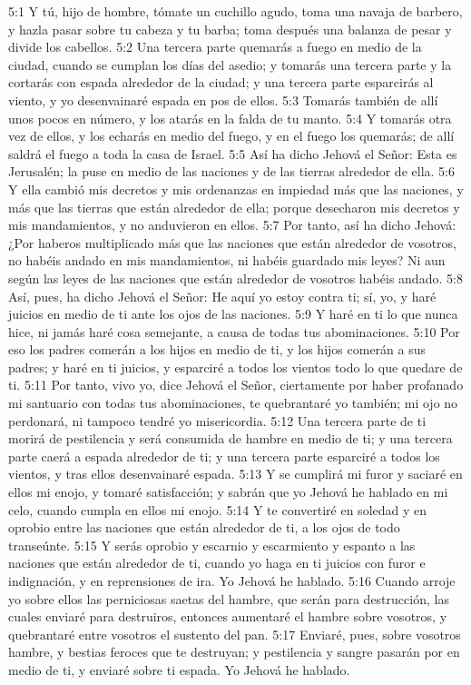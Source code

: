5:1 Y tú, hijo de hombre, tómate un cuchillo agudo, toma una navaja de barbero, y hazla pasar sobre tu cabeza y tu barba; toma después una balanza de pesar y divide los cabellos.   
5:2 Una tercera parte quemarás a fuego en medio de la ciudad, cuando se cumplan los días del asedio; y tomarás una tercera parte y la cortarás con espada alrededor de la ciudad; y una tercera parte esparcirás al viento, y yo desenvainaré espada en pos de ellos.   
5:3 Tomarás también de allí unos pocos en número, y los atarás en la falda de tu manto.   
5:4 Y tomarás otra vez de ellos, y los echarás en medio del fuego, y en el fuego los quemarás; de allí saldrá el fuego a toda la casa de Israel.   
5:5 Así ha dicho Jehová el Señor: Esta es Jerusalén; la puse en medio de las naciones y de las tierras alrededor de ella.   
5:6 Y ella cambió mis decretos y mis ordenanzas en impiedad más que las naciones, y más que las tierras que están alrededor de ella; porque desecharon mis decretos y mis mandamientos, y no anduvieron en ellos.   
5:7 Por tanto, así ha dicho Jehová: ¿Por haberos multiplicado más que las naciones que están alrededor de vosotros, no habéis andado en mis mandamientos, ni habéis guardado mis leyes? Ni aun según las leyes de las naciones que están alrededor de vosotros habéis andado.   
5:8 Así, pues, ha dicho Jehová el Señor: He aquí yo estoy contra ti; sí, yo, y haré juicios en medio de ti ante los ojos de las naciones.   
5:9 Y haré en ti lo que nunca hice, ni jamás haré cosa semejante, a causa de todas tus abominaciones. 
5:10 Por eso los padres comerán a los hijos en medio de ti, y los hijos comerán a sus padres; y haré en ti juicios, y esparciré a todos los vientos todo lo que quedare de ti.   
5:11 Por tanto, vivo yo, dice Jehová el Señor, ciertamente por haber profanado mi santuario con todas tus abominaciones, te quebrantaré yo también; mi ojo no perdonará, ni tampoco tendré yo misericordia.   
5:12 Una tercera parte de ti morirá de pestilencia y será consumida de hambre en medio de ti; y una tercera parte caerá a espada alrededor de ti; y una tercera parte esparciré a todos los vientos, y tras ellos desenvainaré espada.   
5:13 Y se cumplirá mi furor y saciaré en ellos mi enojo, y tomaré satisfacción; y sabrán que yo Jehová he hablado en mi celo, cuando cumpla en ellos mi enojo.   
5:14 Y te convertiré en soledad y en oprobio entre las naciones que están alrededor de ti, a los ojos de todo transeúnte.   
5:15 Y serás oprobio y escarnio y escarmiento y espanto a las naciones que están alrededor de ti, cuando yo haga en ti juicios con furor e indignación, y en reprensiones de ira. Yo Jehová he hablado.   
5:16 Cuando arroje yo sobre ellos las perniciosas saetas del hambre, que serán para destrucción, las cuales enviaré para destruiros, entonces aumentaré el hambre sobre vosotros, y quebrantaré entre vosotros el sustento del pan.   
5:17 Enviaré, pues, sobre vosotros hambre, y bestias feroces que te destruyan; y pestilencia y sangre pasarán por en medio de ti, y enviaré sobre ti espada.  Yo Jehová he hablado.   
